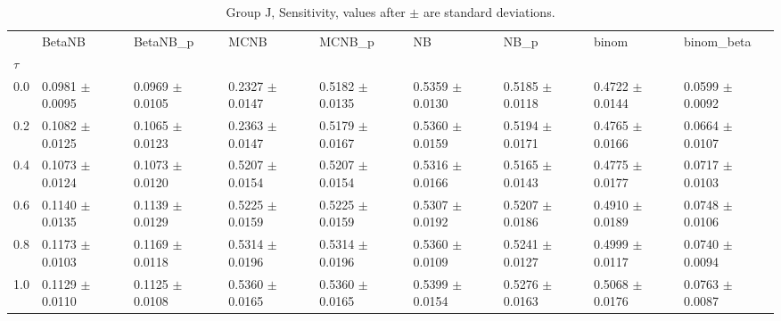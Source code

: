 \begin{table}[H]
\centering
\begin{adjustbox}{max width=\linewidth}
\begin{tabular}{lllllllll}
\toprule
 & BetaNB & BetaNB\_p & MCNB & MCNB\_p & NB & NB\_p & binom & binom\_beta \\
$\tau$ &  &  &  &  &  &  &  &  \\
\midrule
0.0 & 0.0981 $\pm$ 0.0095 & 0.0969 $\pm$ 0.0105 & 0.2327 $\pm$ 0.0147 & 0.5182 $\pm$ 0.0135 & 0.5359 $\pm$ 0.0130 & 0.5185 $\pm$ 0.0118 & 0.4722 $\pm$ 0.0144 & 0.0599 $\pm$ 0.0092 \\
0.2 & 0.1082 $\pm$ 0.0125 & 0.1065 $\pm$ 0.0123 & 0.2363 $\pm$ 0.0147 & 0.5179 $\pm$ 0.0167 & 0.5360 $\pm$ 0.0159 & 0.5194 $\pm$ 0.0171 & 0.4765 $\pm$ 0.0166 & 0.0664 $\pm$ 0.0107 \\
0.4 & 0.1073 $\pm$ 0.0124 & 0.1073 $\pm$ 0.0120 & 0.5207 $\pm$ 0.0154 & 0.5207 $\pm$ 0.0154 & 0.5316 $\pm$ 0.0166 & 0.5165 $\pm$ 0.0143 & 0.4775 $\pm$ 0.0177 & 0.0717 $\pm$ 0.0103 \\
0.6 & 0.1140 $\pm$ 0.0135 & 0.1139 $\pm$ 0.0129 & 0.5225 $\pm$ 0.0159 & 0.5225 $\pm$ 0.0159 & 0.5307 $\pm$ 0.0192 & 0.5207 $\pm$ 0.0186 & 0.4910 $\pm$ 0.0189 & 0.0748 $\pm$ 0.0106 \\
0.8 & 0.1173 $\pm$ 0.0103 & 0.1169 $\pm$ 0.0118 & 0.5314 $\pm$ 0.0196 & 0.5314 $\pm$ 0.0196 & 0.5360 $\pm$ 0.0109 & 0.5241 $\pm$ 0.0127 & 0.4999 $\pm$ 0.0117 & 0.0740 $\pm$ 0.0094 \\
1.0 & 0.1129 $\pm$ 0.0110 & 0.1125 $\pm$ 0.0108 & 0.5360 $\pm$ 0.0165 & 0.5360 $\pm$ 0.0165 & 0.5399 $\pm$ 0.0154 & 0.5276 $\pm$ 0.0163 & 0.5068 $\pm$ 0.0176 & 0.0763 $\pm$ 0.0087 \\
\bottomrule
\end{tabular}

\end{adjustbox}
\caption{Group J, Sensitivity, values after $\pm$ are standard deviations.}
\end{table}


